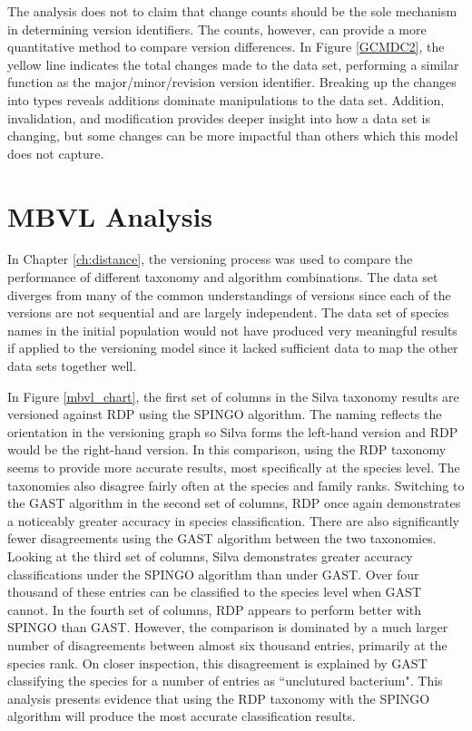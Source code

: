 The analysis does not to claim that change counts should be the sole mechanism in determining version identifiers.
The counts, however, can provide a more quantitative method to compare version differences.
In Figure \ref{GCMDC2}, the yellow line indicates the total changes made to the data set, performing a similar function as the major/minor/revision version identifier.
Breaking up the changes into types reveals additions dominate manipulations to the data set.
Addition, invalidation, and modification provides deeper insight into how a data set is changing, but some changes can be more impactful than others which this model does not capture.

\section{MBVL Analysis}

In Chapter \ref{ch:distance}, the versioning process was used to compare the performance of different taxonomy and algorithm combinations.
The data set diverges from many of the common understandings of versions since each of the versions are not sequential and are largely independent.
The data set of species names in the initial population would not have produced very meaningful results if applied to the versioning model since it lacked sufficient data to map the other data sets together well.

In Figure \ref{mbvl_chart}, the first set of columns in the Silva taxonomy results are versioned against RDP using the SPINGO algorithm.
The naming reflects the orientation in the versioning graph so Silva forms the left-hand version and RDP would be the right-hand version.
In this comparison, using the RDP taxonomy seems to provide more accurate results, most specifically at the species level.
The taxonomies also disagree fairly often at the species and family ranks.
Switching to the GAST algorithm in the second set of columns, RDP once again demonstrates a noticeably greater accuracy in species classification.
There are also significantly fewer disagreements using the GAST algorithm between the two taxonomies.
Looking at the third set of columns, Silva demonstrates greater accuracy classifications under the SPINGO algorithm than under GAST.
Over four thousand of these entries can be classified to the species level when GAST cannot.
In the fourth set of columns, RDP appears to perform better with SPINGO than GAST.
However, the comparison is dominated by a much larger number of disagreements between almost six thousand entries, primarily at the species rank.
On closer inspection, this disagreement is explained by GAST classifying the species for a number of entries as ``unclutured bacterium".
This analysis presents evidence that using the RDP taxonomy with the SPINGO algorithm will produce the most accurate classification results.


